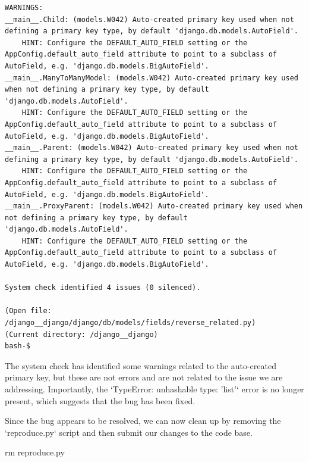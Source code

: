 {\begin{observationbox}
\begin{Verbatim}[breaklines=true, breakanywhere=true]
WARNINGS:
__main__.Child: (models.W042) Auto-created primary key used when not defining a primary key type, by default 'django.db.models.AutoField'.
	HINT: Configure the DEFAULT_AUTO_FIELD setting or the AppConfig.default_auto_field attribute to point to a subclass of AutoField, e.g. 'django.db.models.BigAutoField'.
__main__.ManyToManyModel: (models.W042) Auto-created primary key used when not defining a primary key type, by default 'django.db.models.AutoField'.
	HINT: Configure the DEFAULT_AUTO_FIELD setting or the AppConfig.default_auto_field attribute to point to a subclass of AutoField, e.g. 'django.db.models.BigAutoField'.
__main__.Parent: (models.W042) Auto-created primary key used when not defining a primary key type, by default 'django.db.models.AutoField'.
	HINT: Configure the DEFAULT_AUTO_FIELD setting or the AppConfig.default_auto_field attribute to point to a subclass of AutoField, e.g. 'django.db.models.BigAutoField'.
__main__.ProxyParent: (models.W042) Auto-created primary key used when not defining a primary key type, by default 'django.db.models.AutoField'.
	HINT: Configure the DEFAULT_AUTO_FIELD setting or the AppConfig.default_auto_field attribute to point to a subclass of AutoField, e.g. 'django.db.models.BigAutoField'.

System check identified 4 issues (0 silenced).

(Open file: /django__django/django/db/models/fields/reverse_related.py)
(Current directory: /django__django)
bash-$
\end{Verbatim}
\end{observationbox}
\begin{agentbox}
The system check has identified some warnings related to the auto-created primary key, but these are not errors and are not related to the issue we are addressing. Importantly, the `TypeError: unhashable type: 'list'` error is no longer present, which suggests that the bug has been fixed.



Since the bug appears to be resolved, we can now clean up by removing the `reproduce.py` script and then submit our changes to the code base.



\hrulefill
\begin{CodeVerbatim}[breaklines=true, breakanywhere=true]
rm reproduce.py
\end{CodeVerbatim}
\end{agentbox}
\begin{observationbox}\begin{Verbatim}[breaklines=true, breakanywhere=true]


\end{Verbatim}
\end{observationbox}}
